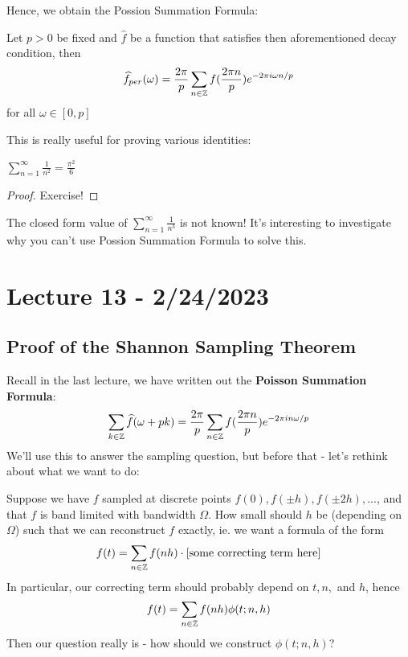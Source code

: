 \documentclass{article}
\begin{document}
Hence, we obtain the Possion Summation Formula:
\begin{theorem}
Let $p > 0$ be fixed and $\widehat{f}$ be a function that satisfies then aforementioned decay condition, then
   $$\widehat{f}_{per}(\omega) = \frac{2\pi}{p} \sum_{n \in \mathbb{Z}} f(\frac{2\pi n}{p}) e^{-2\pi i \omega n/p}$$
for all $\omega \in [0, p]$
\end{theorem}

This is really useful for proving various identities:
\begin{corollary}
    $\sum_{n = 1}^\infty \frac{1}{n^2} = \frac{\pi^2}{6}$
\end{corollary}

\begin{proof}
    Exercise!
\end{proof}

\begin{remark}
    The closed form value of $\sum_{n = 1}^\infty \frac{1}{n^3}$ is not known! It's interesting to investigate why you can't use Possion Summation Formula to solve this.
\end{remark}

\newpage
\section{Lecture 13 - 2/24/2023}

\subsection{Proof of the Shannon Sampling Theorem}
Recall in the last lecture, we have written out the \textbf{Poisson Summation Formula}:
\[\sum_{k \in \mathbb{Z}} \widehat{f}(\omega + pk) = \frac{2\pi}{p} \sum_{n \in \mathbb{Z}} f(\frac{2\pi n}{p}) e^{-2\pi i n \omega/p}\]
We'll use this to answer the sampling question, but before that - let's rethink about what we want to do:

\begin{question}
    Suppose we have $f$ sampled at discrete points $f(0), f(\pm h), f(\pm 2h), ...$, and that $f$ is band limited with bandwidth $\Omega$. How small should $h$ be (depending on $\Omega$) such that we can reconstruct $f$ exactly, ie. we want a formula of the form
    \[f(t) = \sum_{n \in \mathbb{Z}} f(nh) \cdot [\text{some correcting term here}]\]
    In particular, our correcting term should probably depend on $t, n, $ and $h$, hence
    \[f(t) = \sum_{n \in \mathbb{Z}} f(nh) \phi(t; n, h) \]
    Then our question really is - how should we construct $\phi(t; n, h)$?
\end{question}
\end{document}
